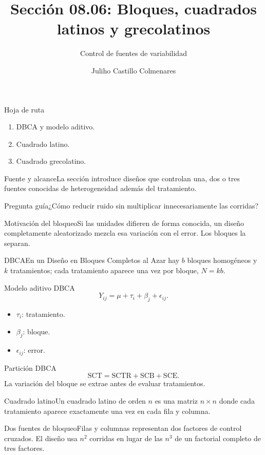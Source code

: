 \documentclass[10pt,aspectratio=169]{beamer}
\title[Bloques y cuadrados latinos]{Sección 08.06: Bloques, cuadrados latinos y grecolatinos}\subtitle{Control de fuentes de variabilidad}\author[J. Castillo Colmenares]{Juliho Castillo Colmenares}\institute{Tecnológico de Monterrey}\date{}
\begin{document}
\begin{frame}[plain]\titlepage\end{frame}
\begin{frame}{Hoja de ruta}\small\begin{enumerate}\item DBCA y modelo aditivo.\item Cuadrado latino.\item Cuadrado grecolatino.\end{enumerate}\end{frame}
\begin{frame}{Fuente y alcance}\small La sección introduce diseños que controlan una, dos o tres fuentes conocidas de heterogeneidad además del tratamiento.\begin{block}{Pregunta guía}¿Cómo reducir ruido sin multiplicar innecesariamente las corridas?\end{block}\end{frame}
\begin{frame}{Motivación del bloqueo}\small Si las unidades difieren de forma conocida, un diseño completamente aleatorizado mezcla esa variación con el error. Los bloques la separan.\end{frame}
\begin{frame}{DBCA}\small En un Diseño en Bloques Completos al Azar hay $b$ bloques homogéneos y $k$ tratamientos; cada tratamiento aparece una vez por bloque, $N=kb$.\end{frame}
\begin{frame}{Modelo aditivo DBCA}\small\[Y_{ij}=\mu+\tau_i+\beta_j+\epsilon_{ij}.\]\begin{itemize}\item $\tau_i$: tratamiento.\item $\beta_j$: bloque.\item $\epsilon_{ij}$: error.\end{itemize}\end{frame}
\begin{frame}{Partición DBCA}\small\[\mathrm{SCT}=\mathrm{SCTR}+\mathrm{SCB}+\mathrm{SCE}.\]La variación del bloque se extrae antes de evaluar tratamientos.\end{frame}
\begin{frame}{Cuadrado latino}\small Un cuadrado latino de orden $n$ es una matriz $n\times n$ donde cada tratamiento aparece exactamente una vez en cada fila y columna.\end{frame}
\begin{frame}{Dos fuentes de bloqueo}\small Filas y columnas representan dos factores de control cruzados. El diseño usa $n^2$ corridas en lugar de las $n^3$ de un factorial completo de tres factores.\end{frame}
\end{document}

